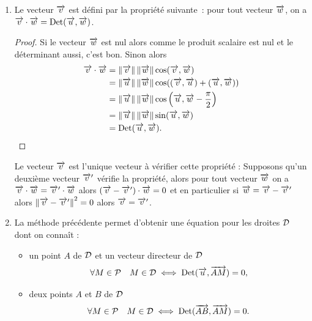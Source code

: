 \begin{enumerate}
    \item Le vecteur \(\vv\) est défini par la propriété suivante~: pour tout 
        vecteur \(\vw\), on a \(\vv \cdot \vw = \Det(\vu , \vw)\).
        \begin{proof}
            Si le vecteur \(\vw\) est nul alors comme le produit scalaire est 
            nul et le déterminant aussi, c'est bon. Sinon alors 
            \begin{align}
                \vv\cdot\vw& = \norme{\vv}\norme{\vw}\cos(\vv , \vw)\\ 
                           & = \norme{\vu}\norme{\vw} \cos((\vv , \vu) + 
                           (\vu , \vw))\\ 
                           & = \norme{\vu}\norme{\vw} \cos\left(\vu , \vw 
                           -\frac{\pi}{2} \right)\\ 
                           & = \norme{\vu} \norme{\vw} \sin(\vu , \vw) \\ 
                           & = \Det(\vu , \vw).
            \end{align}
        \end{proof}
        Le vecteur \(\vv\) est l'unique vecteur à vérifier cette propriété : 
        Supposons qu'un deuxième vecteur \(\vv'\) vérifie la propriété, alors 
        pour tout vecteur \(\vw\) on a \(\vv \cdot \vw =\vv' \cdot \vw\) alors 
        \((\vv - \vv') \cdot \vw = 0\) et en particulier si \(\vw = \vv - \vv'\) 
        alors \(\norme{\vv - \vv'}^2 = 0\) alors \(\vv = \vv'\).
    \item La méthode précédente permet d'obtenir une équation pour les droites 
        \(\Dr\) dont on connaît :
        \begin{itemize}
            \item un point \(A\) de \(\Dr\) et un vecteur directeur de \(\Dr\)
                \begin{equation}
                    \forall M \in \P \quad M \in \Dr \iff \Det(\vu, \vect{AM}) = 
                    0,
                \end{equation}
            \item deux points \(A\) et \(B\) de \(\Dr\) 
                \begin{equation}
                    \forall M \in \P \quad M \in \Dr \iff \Det(\vect{AB}, 
                    \vect{AM}) = 0.
                \end{equation}
        \end{itemize}
\end{enumerate}

